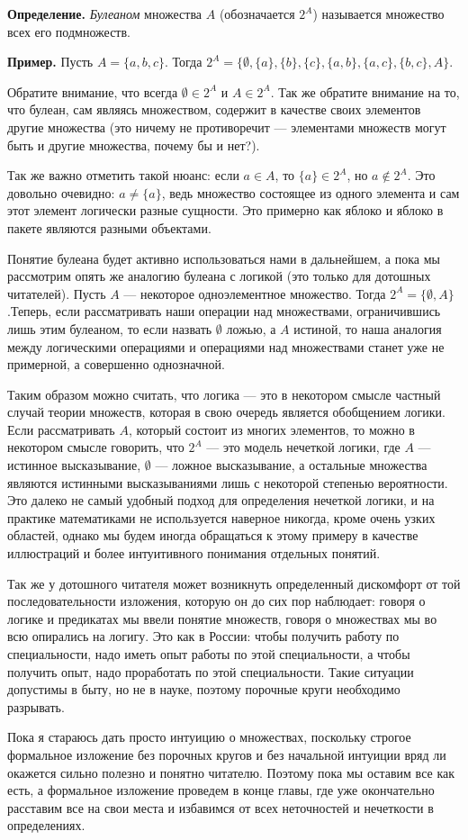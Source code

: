 {\bfseries Определение.} {\slshape Булеаном} множества $A$ (обозначается $2^A$) называется множество всех его подмножеств.

{\bfseries Пример.} Пусть $A = \{a, b, c\}$. Тогда $2^A = \{\emptyset, \{a\}, \{b\}, \{c\}, \{a, b\}, \{a, c\}, \{b, c\}, A\}$.

Обратите внимание, что всегда $\emptyset \in 2^A$ и $A\in 2^A$. Так же обратите внимание на то, что булеан, сам являясь множеством, содержит в качестве своих элементов другие множества (это ничему не противоречит — элементами множеств могут быть и другие множества, почему бы и нет?).

Так же важно отметить такой нюанс: если $a \in A$, то $\{a\} \in 2^A$, но $a \not \in 2^A$. Это довольно очевидно: $a\not = \{a\}$, ведь множество состоящее из одного элемента и сам этот элемент логически разные сущности. Это примерно как яблоко и яблоко в пакете являются разными объектами.

Понятие булеана будет активно использоваться нами в дальнейшем, а пока мы рассмотрим опять же аналогию булеана с логикой (это только для дотошных читателей). Пусть $A$ — некоторое одноэлементное множество. Тогда $2^A = \{\emptyset, A\}$.Теперь, если рассматривать наши операции над множествами, ограничившись лишь этим булеаном, то если назвать $\emptyset$ ложью, а $A$ истиной, то наша аналогия между логическими операциями и операциями над множествами станет уже не примерной, а совершенно однозначной.

Таким образом можно считать, что логика — это в некотором смысле частный случай теории множеств, которая в свою очередь является обобщением логики. Если рассматривать $A$, который состоит из многих элементов, то можно в некотором смысле говорить, что $2^A$ — это модель нечеткой логики, где $A$ — истинное высказывание, $\emptyset$ — ложное высказывание, а остальные множества являются истинными высказываниями лишь с некоторой степенью вероятности. Это далеко не самый удобный подход для определения нечеткой логики, и на практике математиками не используется наверное никогда, кроме очень узких областей, однако мы будем иногда обращаться к этому примеру в качестве иллюстраций и более интуитивного понимания отдельных понятий.

Так же у дотошного читателя может возникнуть определенный дискомфорт от той последовательности изложения, которую он до сих пор наблюдает: говоря о логике и предикатах мы ввели понятие множеств, говоря о множествах мы во всю опирались на логигу. Это как в России: чтобы получить работу по специальности, надо иметь опыт работы по этой специальности, а чтобы получить опыт, надо проработать по этой специальности. Такие ситуации допустимы в быту, но не в науке, поэтому порочные круги необходимо разрывать.

Пока я стараюсь дать просто интуицию о множествах, поскольку строгое формальное изложение без порочных кругов и без начальной интуиции вряд ли окажется сильно полезно и понятно читателю. Поэтому пока мы оставим все как есть, а формальное изложение проведем в конце главы, где уже окончательно расставим все на свои места и избавимся от всех неточностей и нечеткости в определениях.
